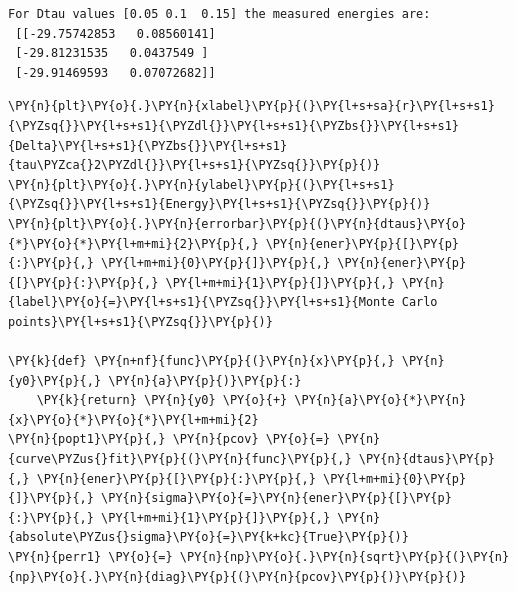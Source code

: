     \begin{Verbatim}[commandchars=\\\{\}]
For Dtau values [0.05 0.1  0.15] the measured energies are:
 [[-29.75742853   0.08560141]
 [-29.81231535   0.0437549 ]
 [-29.91469593   0.07072682]]
    \end{Verbatim}

    \begin{tcolorbox}[breakable, size=fbox, boxrule=1pt, pad at break*=1mm,colback=cellbackground, colframe=cellborder]
\begin{Verbatim}[commandchars=\\\{\}]
\PY{n}{plt}\PY{o}{.}\PY{n}{xlabel}\PY{p}{(}\PY{l+s+sa}{r}\PY{l+s+s1}{\PYZsq{}}\PY{l+s+s1}{\PYZdl{}}\PY{l+s+s1}{\PYZbs{}}\PY{l+s+s1}{Delta}\PY{l+s+s1}{\PYZbs{}}\PY{l+s+s1}{tau\PYZca{}2\PYZdl{}}\PY{l+s+s1}{\PYZsq{}}\PY{p}{)}
\PY{n}{plt}\PY{o}{.}\PY{n}{ylabel}\PY{p}{(}\PY{l+s+s1}{\PYZsq{}}\PY{l+s+s1}{Energy}\PY{l+s+s1}{\PYZsq{}}\PY{p}{)}
\PY{n}{plt}\PY{o}{.}\PY{n}{errorbar}\PY{p}{(}\PY{n}{dtaus}\PY{o}{*}\PY{o}{*}\PY{l+m+mi}{2}\PY{p}{,} \PY{n}{ener}\PY{p}{[}\PY{p}{:}\PY{p}{,} \PY{l+m+mi}{0}\PY{p}{]}\PY{p}{,} \PY{n}{ener}\PY{p}{[}\PY{p}{:}\PY{p}{,} \PY{l+m+mi}{1}\PY{p}{]}\PY{p}{,} \PY{n}{label}\PY{o}{=}\PY{l+s+s1}{\PYZsq{}}\PY{l+s+s1}{Monte Carlo points}\PY{l+s+s1}{\PYZsq{}}\PY{p}{)}

\PY{k}{def} \PY{n+nf}{func}\PY{p}{(}\PY{n}{x}\PY{p}{,} \PY{n}{y0}\PY{p}{,} \PY{n}{a}\PY{p}{)}\PY{p}{:}
    \PY{k}{return} \PY{n}{y0} \PY{o}{+} \PY{n}{a}\PY{o}{*}\PY{n}{x}\PY{o}{*}\PY{o}{*}\PY{l+m+mi}{2}
\PY{n}{popt1}\PY{p}{,} \PY{n}{pcov} \PY{o}{=} \PY{n}{curve\PYZus{}fit}\PY{p}{(}\PY{n}{func}\PY{p}{,} \PY{n}{dtaus}\PY{p}{,} \PY{n}{ener}\PY{p}{[}\PY{p}{:}\PY{p}{,} \PY{l+m+mi}{0}\PY{p}{]}\PY{p}{,} \PY{n}{sigma}\PY{o}{=}\PY{n}{ener}\PY{p}{[}\PY{p}{:}\PY{p}{,} \PY{l+m+mi}{1}\PY{p}{]}\PY{p}{,} \PY{n}{absolute\PYZus{}sigma}\PY{o}{=}\PY{k+kc}{True}\PY{p}{)}
\PY{n}{perr1} \PY{o}{=} \PY{n}{np}\PY{o}{.}\PY{n}{sqrt}\PY{p}{(}\PY{n}{np}\PY{o}{.}\PY{n}{diag}\PY{p}{(}\PY{n}{pcov}\PY{p}{)}\PY{p}{)}


\end{Verbatim}
\end{tcolorbox}
